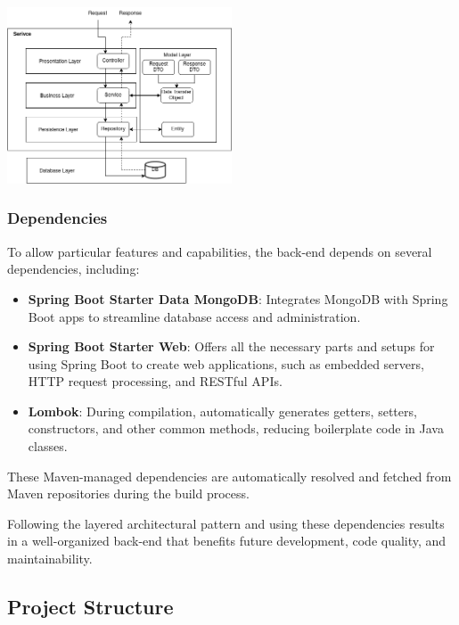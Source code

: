 \documentclass[conference]{IEEEtran}
\begin{document}
\begin{center}
    \centering
    \includegraphics[width=0.5\textwidth]{LayeredArchitecture.png}
    \label{fig:backend_architecture}
\end{center}

\subsubsection{Dependencies}
To allow particular features and capabilities, the back-end depends on several dependencies, including:

\begin{itemize} \item \textbf{Spring Boot Starter Data MongoDB}: Integrates MongoDB with Spring Boot apps to streamline database access and administration.
    
    \item \textbf{Spring Boot Starter Web}: Offers all the necessary parts and setups for using Spring Boot to create web applications, such as embedded servers, HTTP request processing, and RESTful APIs.
    
    \item \textbf{Lombok}: During compilation, automatically generates getters, setters, constructors, and other common methods, reducing boilerplate code in Java classes.
\end{itemize}

These Maven-managed dependencies are automatically resolved and fetched from Maven repositories during the build process.

Following the layered architectural pattern and using these dependencies results in a well-organized back-end that benefits future development, code quality, and maintainability.



\subsection{Project Structure}
\end{document}
